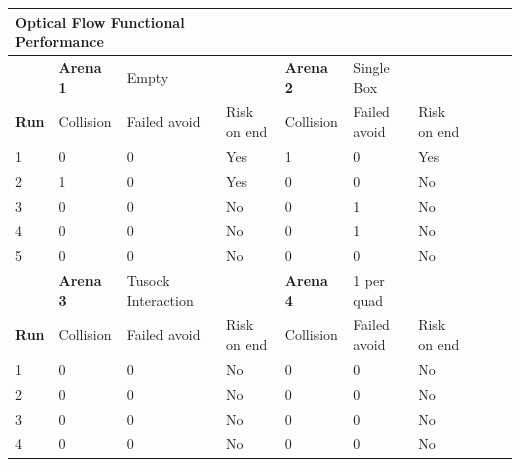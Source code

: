 \documentclass[a4paper,12pt]{article}
\begin{document}
\begin{center}
  \begin{table}
    \begin{tabular}{|l|l|l|l|l|l|l|l|l|l|}
      \hline
      \multicolumn{4}{|l|}{\textbf{Optical Flow Functional Performance} }   &                  &              &               \\ \hline
                   & \textbf{Arena 1} & Empty              &             & \textbf{Arena 2} & Single Box   &               \\ \hline
      \textbf{Run} & Collision        & Failed avoid       & Risk on end & Collision        & Failed avoid & Risk on end   \\ \hline
      1            &  0               & 0                  & Yes         & 1                & 0            & Yes           \\ \hline
      2            &  1               & 0                  & Yes         & 0                & 0            & No            \\ \hline
      3            &  0               & 0                  & No          & 0                & 1            & No            \\ \hline
      4            &  0               & 0                  & No          & 0                & 1            & No            \\ \hline 
      5            &  0               & 0                  & No          & 0                & 0            & No            \\ \hline
                   & \textbf{Arena 3} & Tusock Interaction &             & \textbf{Arena 4} & 1 per quad   &               \\ \hline
      \textbf{Run} & Collision        & Failed avoid       & Risk on end & Collision        & Failed avoid & Risk on end   \\ \hline
      1            & 0                & 0                  & No          & 0                & 0            & No            \\ \hline
      2            & 0                & 0                  & No          & 0                & 0            & No            \\ \hline
      3            & 0                & 0                  & No          & 0                & 0            & No            \\ \hline
      4            & 0                & 0                  & No          & 0                & 0            & No            \\ \hline 

\end{tabular}
\end{table}
\end{center}
\end{document}
